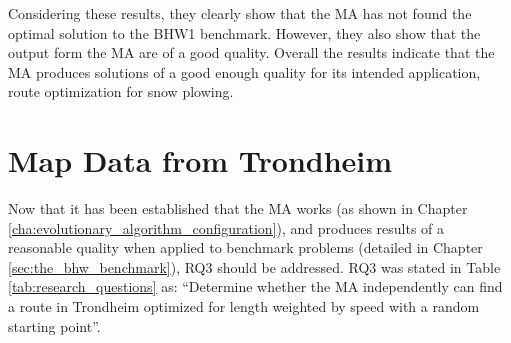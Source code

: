 Considering these results, they clearly show that the MA has not found the optimal solution to the BHW1 benchmark. However, they also show that the output form the MA are of a good quality. Overall the results indicate that the MA produces solutions of a good enough quality for its intended application, route optimization for snow plowing.

{
\begin{table}[tbph]
\centering
{} %
\caption{The best result obtained from the MA and the known optimal solution for the BHW1 benchmark.}
\label{tab:BHW1_solutions_compared}
\end{table}
}

\section{Map Data from Trondheim}
\label{sec:map_data_from_trondheim}

Now that it has been established that the MA works (as shown in Chapter \ref{cha:evolutionary_algorithm_configuration}), and produces results of a reasonable quality when applied to benchmark problems (detailed in Chapter \ref{sec:the_bhw_benchmark}), RQ3 should be addressed. RQ3 was stated in Table \ref{tab:research_questions} as: \enquote{Determine whether the MA independently can find a route in Trondheim optimized for length weighted by speed with a random starting point}.

